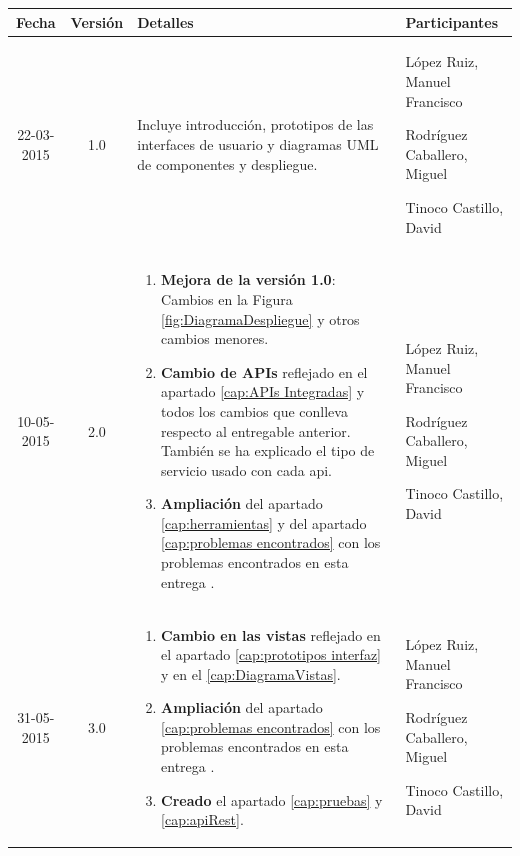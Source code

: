 \documentclass{scrartcl}
\begin{document}
\begin{tabularx}{14.9cm}{|c|c|X|X|}
	\hline \textbf{Fecha} & \textbf{Versión} & \centering \textbf{Detalles} & \textbf{Participantes} \\ 
	\hline 22-03-2015 & 1.0 & Incluye introducción, prototipos de las interfaces de usuario y diagramas UML de componentes y despliegue.  & 
	López Ruiz, Manuel Francisco
	
	Rodríguez Caballero, Miguel
	
	Tinoco Castillo, David \\	 
		\hline 10-05-2015 & 2.0 & \begin{enumerate}[\textbf{\textperiodcentered}]
		\item \textbf{Mejora de la versión 1.0}: Cambios en la Figura \ref{fig:DiagramaDespliegue} y otros cambios menores. 
		 \item \textbf{Cambio de APIs} reflejado en el apartado \ref{cap:APIs Integradas} y todos los cambios que conlleva respecto al entregable anterior. También se ha explicado el tipo de servicio usado con cada api.
		
		\item \textbf{Ampliación} del apartado \ref{cap:herramientas} y del apartado \ref{cap:problemas encontrados} con los problemas encontrados en esta entrega  . \end{enumerate}
		 & 
		López Ruiz, Manuel Francisco
		
		Rodríguez Caballero, Miguel
		
		Tinoco Castillo, David \\
		\hline 31-05-2015 & 3.0 & \begin{enumerate}[\textbf{\textperiodcentered}]
			\item \textbf{Cambio  en las vistas} reflejado en el apartado \ref{cap:prototipos interfaz} y en el \ref{cap:DiagramaVistas}.
			
			\item \textbf{Ampliación} del apartado \ref{cap:problemas encontrados} con los problemas encontrados en esta entrega .
			
			\item \textbf{Creado} el apartado \ref{cap:pruebas} y \ref{cap:apiRest}. \end{enumerate}
		& 
		López Ruiz, Manuel Francisco
		
		Rodríguez Caballero, Miguel
		
		Tinoco Castillo, David \\	 
	\hline  
	
\end{tabularx} 
\end{document}
